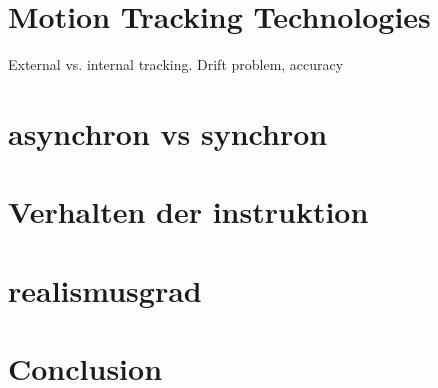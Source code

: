 \section{Motion Tracking Technologies}
External vs. internal tracking. Drift problem, accuracy

\section{asynchron vs synchron}
\section{Verhalten der instruktion}
\section{realismusgrad}
\section{Conclusion}